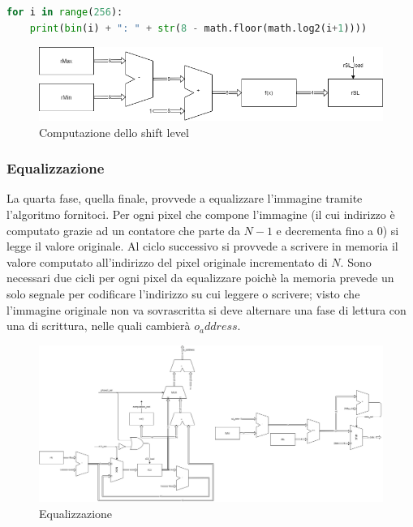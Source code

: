\documentclass[11pt]{article} %
\begin{document}
\begin{lstlisting}[language=Python, caption=Generazione di soglie, label={lst:soglie}]
for i in range(256):
	print(bin(i) + ": " + str(8 - math.floor(math.log2(i+1))))
\end{lstlisting}

\begin{figure}[h]
\centering
\includegraphics[width=120mm]{datapaths/regSL_final.png}
\caption{Computazione dello shift level}
\end{figure}


\subsubsection{Equalizzazione}
La quarta fase, quella finale, provvede a equalizzare l'immagine tramite l'algoritmo fornitoci. Per ogni pixel che compone l'immagine (il cui indirizzo è computato grazie ad un contatore che parte da $N-1$ e decrementa fino a 0) si legge il valore originale. Al ciclo successivo si provvede a scrivere in memoria il valore computato all'indirizzo del pixel originale incrementato di $N$. Sono necessari due cicli per ogni pixel da equalizzare poichè la memoria prevede un solo segnale per codificare l'indirizzo su cui leggere o scrivere; visto che l'immagine originale non va sovrascritta si deve alternare una fase di lettura con una di scrittura, nelle quali cambierà $o_address$.

\begin{figure}[h]
\centering
\includegraphics[width=120mm]{datapaths/computation.png}
\caption{Equalizzazione}
\end{figure}
\end{document}
